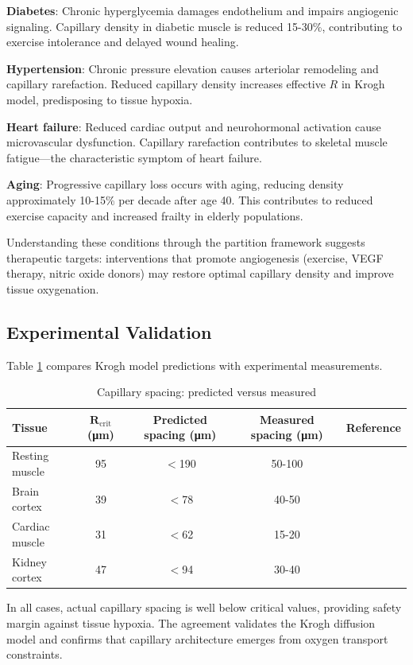 \textbf{Diabetes}: Chronic hyperglycemia damages endothelium and impairs angiogenic signaling. Capillary density in diabetic muscle is reduced 15-30\%, contributing to exercise intolerance and delayed wound healing.

\textbf{Hypertension}: Chronic pressure elevation causes arteriolar remodeling and capillary rarefaction. Reduced capillary density increases effective $R$ in Krogh model, predisposing to tissue hypoxia.

\textbf{Heart failure}: Reduced cardiac output and neurohormonal activation cause microvascular dysfunction. Capillary rarefaction contributes to skeletal muscle fatigue—the characteristic symptom of heart failure.

\textbf{Aging}: Progressive capillary loss occurs with aging, reducing density approximately 10-15\% per decade after age 40. This contributes to reduced exercise capacity and increased frailty in elderly populations.

Understanding these conditions through the partition framework suggests therapeutic targets: interventions that promote angiogenesis (exercise, VEGF therapy, nitric oxide donors) may restore optimal capillary density and improve tissue oxygenation.

\subsection{Experimental Validation}

Table \ref{tab:capillary_validation} compares Krogh model predictions with experimental measurements.

\begin{table}[h]
\centering
\caption{Capillary spacing: predicted versus measured}
\label{tab:capillary_validation}
\begin{tabular}{lcccc}
\toprule
\textbf{Tissue} & \textbf{$\boldsymbol{R_{\mathrm{crit}}}$ (μm)} & \textbf{Predicted spacing (μm)} & \textbf{Measured spacing (μm)} & \textbf{Reference} \\
\midrule
Resting muscle & 95 & $<$190 & 50-100 & \cite{hudlicka1992muscle} \\
Brain cortex & 39 & $<$78 & 40-50 & \cite{pawlik1981quantitative} \\
Cardiac muscle & 31 & $<$62 & 15-20 & \cite{rakusan1971quantitative} \\
Kidney cortex & 47 & $<$94 & 30-40 & \cite{beeuwkes1975renal} \\
\bottomrule
\end{tabular}
\end{table}

In all cases, actual capillary spacing is well below critical values, providing safety margin against tissue hypoxia. The agreement validates the Krogh diffusion model and confirms that capillary architecture emerges from oxygen transport constraints.
